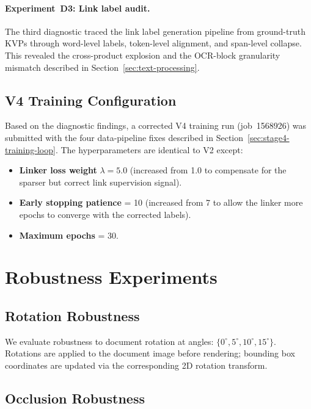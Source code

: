 \paragraph{Experiment~D3: Link label audit.}
The third diagnostic traced the link label generation pipeline from
ground-truth KVPs through word-level labels, token-level alignment, and
span-level collapse.  This revealed the cross-product explosion and the
OCR-block granularity mismatch described in
Section~\ref{sec:text-processing}.

\subsection{V4 Training Configuration}
\label{sec:v4-training}

Based on the diagnostic findings, a corrected V4 training run (job~1568926)
was submitted with the four data-pipeline fixes described in
Section~\ref{sec:stage4-training-loop}.  The hyperparameters are identical
to V2 except:
\begin{itemize}
  \item \textbf{Linker loss weight} $\lambda = 5.0$ (increased from 1.0 to
  compensate for the sparser but correct link supervision signal).
  \item \textbf{Early stopping patience} = 10 (increased from 7 to allow the
  linker more epochs to converge with the corrected labels).
  \item \textbf{Maximum epochs} = 30.
\end{itemize}

\section{Robustness Experiments}
\label{sec:robustness-experiments}

\subsection{Rotation Robustness}
\label{sec:rotation-robustness}

We evaluate robustness to document rotation at angles:
$\{0^\circ, 5^\circ, 10^\circ, 15^\circ\}$. Rotations are applied to the
document image before rendering; bounding box coordinates are updated via
the corresponding 2D rotation transform.

\subsection{Occlusion Robustness}
\label{sec:occlusion-robustness}


